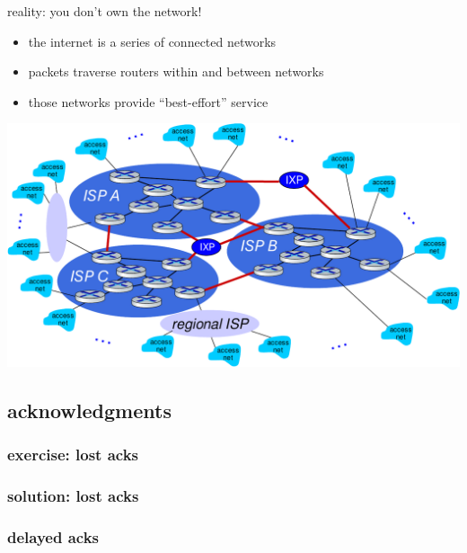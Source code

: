 \begin{frame}{reality: you don't own the network!}
    \begin{itemize}
    \item the internet is a series of connected networks
    \item packets traverse routers within and between networks
    \item those networks provide ``best-effort'' service
    \end{itemize}
    \begin{center}
        \includegraphics[width=0.4\pagewidth]{../network/network-of-network}
    \end{center}
\end{frame}



\subsection{acknowledgments}

\subsubsection{exercise: lost acks}

\subsubsection{solution: lost acks}
\iftoggle{heldback}{}{}
\subsubsection{delayed acks}



